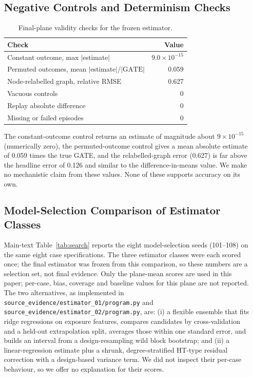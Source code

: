 \documentclass{article}
\newcommand{\gate}{\mathrm{GATE}}
\begin{document}
\subsection{Negative Controls and Determinism Checks}
\begin{table}[h]
\centering\small
\caption{Final-plane validity checks for the frozen estimator.}
\label{tab:controls}
\begin{tabular}{lr}
\toprule
Check & Value\\
\midrule
Constant outcome, max $|$estimate$|$ & $9.0\times10^{-15}$\\ %
Permuted outcomes, mean $|$estimate$|/|\gate|$ & 0.059\\ %
Node-relabelled graph, relative RMSE & 0.627\\ %
Vacuous controls & 0\\ %
Replay absolute difference & 0\\ %
Missing or failed episodes & 0\\ %
\bottomrule
\end{tabular}
\end{table}
The constant-outcome control returns an estimate of magnitude about $9\times10^{-15}$ (numerically zero), the permuted-outcome control gives a mean absolute estimate of 0.059 times the true GATE, and the relabelled-graph error (0.627) is far above the headline error of 0.126 and similar to the difference-in-means value. We make no mechanistic claim from these values. None of these supports accuracy on its own.

\subsection{Model-Selection Comparison of Estimator Classes}
Main-text Table~\ref{tab:search} reports the eight model-selection seeds (101--108) on the same eight case specifications. The three estimator classes were each scored once; the final estimator was frozen from this comparison, so these numbers are a selection set, not final evidence. Only the plane-mean scores are used in this paper; per-case, bias, coverage and baseline values for this plane are not reported. The two alternatives, as implemented in \texttt{source\_evidence/estimator\_01/program.py} and \texttt{source\_evidence/estimator\_02/program.py}, are: (i) a flexible ensemble that fits ridge regressions on exposure features, compares candidates by cross-validation and a held-out extrapolation split, averages those within one standard error, and builds an interval from a design-resampling wild block bootstrap; and (ii) a linear-regression estimate plus a shrunk, degree-stratified HT-type residual correction with a design-based variance term. We did not inspect their per-case behaviour, so we offer no explanation for their scores.
\end{document}
